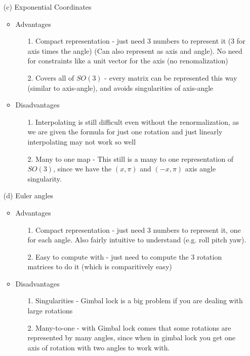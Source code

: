 \documentclass[english]{article}
\begin{document}
\begin{enumerate}
 \item[(c)] Exponential Coordinates 
    \begin{itemize}
     \item Advantages
     \begin{enumerate}
      \item[1.] Compact representation - just need 3 numbers to represent it (3 for axis times the angle) (Can also represent as axis and angle). No need for constraints like a unit vector for the axis (no renomalization)
      \item[2.] Covers all of $SO(3)$ - every matrix can be represented this way (similar to axis-angle), and avoids singularities of axis-angle
     \end{enumerate}
     \item Disadvantages
     \begin{enumerate}
      \item[1.] Interpolating is still difficult even without the renormalization, as we are given the formula for just one rotation and just linearly interpolating may not work so well
      \item[2.] Many to one map - This still is a many to one representation of $SO(3)$, since we have the $(x,\pi)$ and $(-x,\pi)$
                axis angle singularity.
     \end{enumerate}
    \end{itemize}

 \item[(d)] Euler angles 
    \begin{itemize}
     \item Advantages
     \begin{enumerate}
      \item[1.] Compact representation - just need 3 numbers to represent it, one for each angle. Also fairly intuitive to understand (e.g. roll pitch yaw).
      \item[2.] Easy to compute with - just need to compute the 3 rotation matrices to do it (which is comparitively easy)
     \end{enumerate}
     \item Disadvantages
     \begin{enumerate}
      \item[1.] Singularities - Gimbal lock is a big problem if you are dealing with large rotations
      \item[2.] Many-to-one - with Gimbal lock comes that some rotations are represented by many angles, since when in gimbal lock you get one axis of rotation with two angles to work with.
     \end{enumerate}
    \end{itemize}


\end{enumerate}
\end{document}
